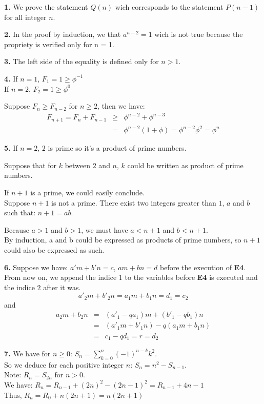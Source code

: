 \documentclass[a4paper,12pt]{article}
\begin{document}
\noindent
\textbf{1.} We prove the statement $Q(n)$ wich corresponds to the statement 
$P(n-1)$ for all integer $n$.

\bigskip
\noindent
\textbf{2.} In the proof by induction, we that $a^{n-2} = 1$ wich is not true
because the propriety is verified only for n = 1.

\bigskip
\noindent
\textbf{3.} The left side of the equality is defined only for $n > 1$.

\bigskip
\noindent
\textbf{4.} If $n = 1$, $F_1 = 1 \ge \phi^{-1}$\\
If $n = 2$, $F_2 = 1 \ge \phi^0$

\medskip
Suppose $F_n \ge F_{n-2}$ for $n \ge 2$, then we have:
\begin{eqnarray*}
F_{n+1} = F_n + F_{n-1} & \ge & \phi^{n-2} + \phi^{n-3} \\ & = &
\phi^{n-2} (1 + \phi) = \phi^{n-2} \phi^2 = \phi^n
\end{eqnarray*}

\bigskip
\noindent
\textbf{5.} If $n = 2$, $2$ is prime so it's a product of prime numbers.

\medskip
Suppose that for $k$ between $2$ and $n$, $k$ could be written as product
of prime numbers.

If $n+1$ is a prime, we could easily conclude.\\
Suppose $n+1$ is not a prime.  There exist two integers greater than $1$,
$a$ and $b$ such that: $n+1 = a b$.

\medskip
Because $a > 1$ and $b > 1$, we must have $a < n+1$ and $b < n+1$.\\
By induction, a and b could be expressed as products of prime numbers, so 
$n+1$ could also be expressed as such.

\bigskip
\noindent
\textbf{6.} Suppose we have: $a' m + b' n = c$, $a m + b n = d$ before
the execution of \textbf{E4}. From now on, we append the indice $1$ to 
the variables before \textbf{E4} is executed and the indice $2$ after
it was.
\[ a'_2 m + b'_2 n = a_1 m + b_1 n = d_1 = c_2 \] and
\begin{eqnarray*}
a_2 m + b_2 n & = & (a'_1 - q a_1) m + (b'_1 - q b_1) n\\
& = & (a'_1 m + b'_1 n) - q (a_1 m + b_1 n)\\
& = & c_1 - q d_1 = r = d_2
\end{eqnarray*}

\bigskip
\noindent
\textbf{7.} We have for $n \ge 0$: $S_n = \sum_{k = 0}^{n} (-1)^{n-k} k^2$.\\
So we deduce for each positive integer $n$: $S_n = n^2 - S_{n-1}$.\\
Note: $R_n = S_{2n}$ for $n > 0$.\\
We have: $R_n = R_{n-1} + (2n)^2 - (2n-1)^2 = R_{n-1} + 4 n - 1$\\
Thus, $R_n = R_0 + n(2n+1) = n(2n+1)$
\end{document}
